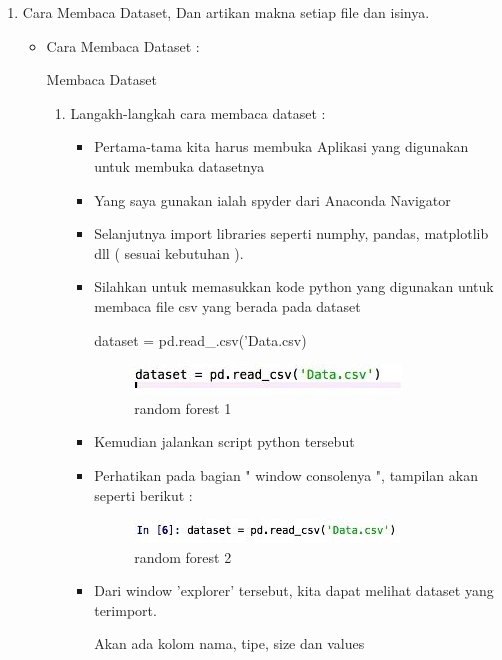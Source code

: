 \begin{enumerate}
\begin{itemize}
\par
\end{itemize}
\item Cara Membaca Dataset, Dan artikan makna setiap file dan isinya.
\begin{itemize}
\item Cara Membaca Dataset :
\par Membaca Dataset
\begin{enumerate}
\item Langakh-langkah cara membaca dataset :
\begin{itemize}
\item Pertama-tama kita harus membuka Aplikasi yang digunakan untuk membuka datasetnya 
\item Yang saya gunakan ialah spyder dari Anaconda Navigator
\item Selanjutnya import libraries seperti numphy, pandas, matplotlib dll ( sesuai kebutuhan ).
\item Silahkan untuk memasukkan kode python yang digunakan untuk membaca file csv yang berada pada dataset 
\par dataset = pd.read\_.csv('Data.csv)
\par
\begin{figure}[ht]
\centering
\includegraphics[scale=0.6]{figures/data1.jpg}
\caption{random forest 1}
\label{contoh}
\end{figure}
\par
\par
\item Kemudian jalankan script python tersebut
\item Perhatikan pada bagian " window consolenya ", tampilan akan seperti berikut :
\par
\par
\begin{figure}[ht]
\centering
\includegraphics[scale=0.6]{figures/data2.jpg}
\caption{random forest 2}
\label{contoh}
\end{figure}
\par
\par
\item Dari window 'explorer' tersebut, kita dapat melihat dataset yang terimport.
\par Akan ada kolom nama, tipe, size dan values

\end{itemize}
\end{enumerate}
\end{itemize}
\end{enumerate}
